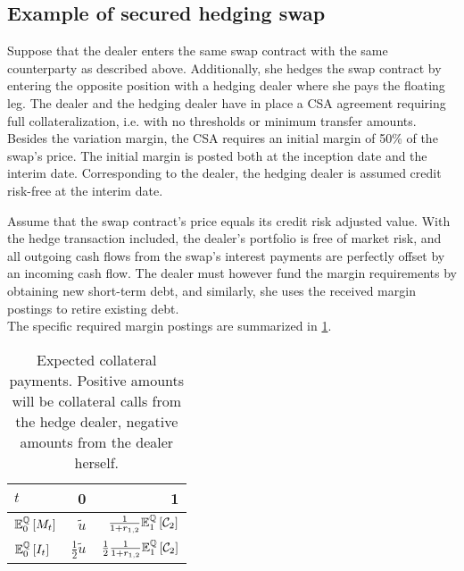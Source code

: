 \documentclass[main.tex]{subfiles}
\begin{document}
        \subsection{Example of secured hedging swap}
            Suppose that the dealer enters the same swap contract with the same counterparty as described above.
            Additionally, she hedges the swap contract by entering the opposite position with a hedging dealer
            where she pays the floating leg.
            The dealer and the hedging dealer have in place a CSA agreement 
            requiring full collateralization, i.e. with no thresholds or minimum transfer amounts.
            Besides the variation margin,
            the CSA requires an initial margin of 50\% of the swap's price.
            The initial margin is posted both at the inception date and the interim date.
            Corresponding to the dealer, the hedging dealer is assumed credit risk-free at the interim date.

            Assume that the swap contract's price equals its credit risk adjusted value.
            With the hedge transaction included,
            the dealer's portfolio is free of market risk,
            and all outgoing cash flows from the swap's interest payments
            are perfectly offset by an incoming cash flow.
            The dealer must however fund the margin requirements by obtaining new short-term debt,
            and similarly, she uses the received margin postings to retire existing debt.
            \\
            The specific required margin postings are summarized in \cref{tbl:swap-margin-postings}.

            \begin{table}[H]
                \centering
                \begin{tabular}{l|rr}
                    $t$ & 0 & 1 \\
                    \hline
                    \rule{0pt}{1.3em}
                    $\mathbb{E}_{0}^{\mathbb{Q}}\left[M_t\right]$ & $\tilde{u}$ & $\frac{1}{1+r_{1,2}}\mathbb{E}_{1}^{\mathbb{Q}}\left[\mathcal{C}_{2}\right]$ \\
                    \rule{0pt}{1.3em}
                    $\mathbb{E}_{0}^{\mathbb{Q}}\left[I_t\right]$ & $\frac{1}{2}\tilde{u}$ & $\frac{1}{2}\frac{1}{1+r_{1,2}}\mathbb{E}_{1}^{\mathbb{Q}}\left[\mathcal{C}_{2}\right]$ \\
                \end{tabular}
                \caption{
                    Expected collateral payments. 
                    Positive amounts will be collateral calls from the hedge dealer,
                    negative amounts from the dealer herself.
                }
                \label{tbl:swap-margin-postings}
            \end{table}
\end{document}
